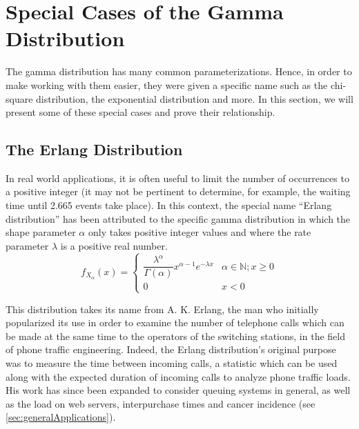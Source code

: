 \documentclass[12pt]{article}
\begin{document}
\pagebreak
\section{Special Cases of the Gamma Distribution}
The gamma distribution has many common parameterizations. Hence, in order to make working with them easier, they were
given a specific name such as the chi-square distribution, the exponential distribution and more. In this section, we
will present some of these special cases and prove their relationship.

\subsection{The Erlang Distribution}
In real world applications, it is often useful to limit the number of occurrences to a positive integer (it may not be
pertinent to determine, for example, the waiting time until 2.665 events take place). In this context, the special name
“Erlang distribution” has been attributed to the specific gamma distribution in which the shape parameter $\alpha$ only
takes positive integer values and where the rate parameter $\lambda$ is a positive real number.
\begin{equation}
	f_{X_\alpha}(x)	= 	\begin{cases}
							\dfrac{\lambda^\alpha}{\Gamma(\alpha)}x^{\alpha-1}e^{-\lambda x}  & \alpha\in\mathbb{N}; x\geq0\\
							0  & x<0
  						\end{cases}
\end{equation}

This distribution takes its name from A. K. Erlang, the man who initially popularized its use in order to examine the
number of telephone calls which can be made at the same time to the operators of the switching stations, in the field of
phone traffic engineering. Indeed, the Erlang distribution's original purpose was to measure the time between incoming
calls, a statistic which can be used along with the expected duration of incoming calls to analyze phone traffic loads.
His work has since been expanded to consider queuing systems in general, as well as the load on web servers,
interpurchase times and cancer incidence (see \autoref{sec:generalApplications})\cite{zachWhatErlangDistribution2020}.

\end{document}
